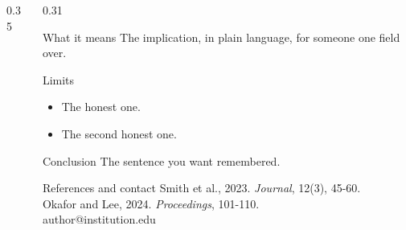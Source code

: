 \documentclass[final]{beamer}
\begin{document}
\begin{frame}[t]
\begin{columns}[t]
\begin{column}{0.35\textwidth}
    \end{column}

    \begin{column}{0.31\textwidth}

      \begin{block}{What it means}
        The implication, in plain language, for someone one field over.
      \end{block}

      \begin{block}{Limits}
        \begin{itemize}
          \item The honest one.
          \item The second honest one.
        \end{itemize}
      \end{block}

      \begin{block}{Conclusion}
        The sentence you want remembered.
      \end{block}

      \begin{block}{References and contact}
        {\small
          Smith et al., 2023. \emph{Journal}, 12(3), 45-60.\\
          Okafor and Lee, 2024. \emph{Proceedings}, 101-110.\\[0.4cm]
          author@institution.edu
        }
      \end{block}

    \end{column}

  \end{columns}

\end{frame}
\end{document}
